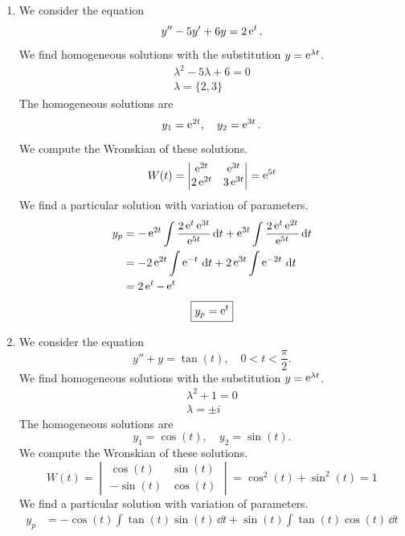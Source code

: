 {%
\begin{Solution}
  \label{solution y5y6y2et}
  \begin{enumerate}
  \item 
    We consider the equation
    \[
    y'' - 5 y' + 6 y = 2 \mathop{\mathrm{e}}\nolimits^t.
    \]
    We find homogeneous solutions with the substitution $y = \mathop{\mathrm{e}}\nolimits^{\lambda t}$.
    \begin{gather*}
      \lambda^2 - 5 \lambda + 6 = 0 \\
      \lambda = \{ 2, 3 \} 
    \end{gather*}
    The homogeneous solutions are
    \[
    y_1 = \mathop{\mathrm{e}}\nolimits^{2t}, \quad y_2 = \mathop{\mathrm{e}}\nolimits^{3t}.
    \]
    We compute the Wronskian of these solutions.
    \[
    W(t) = \begin{vmatrix}
      \mathop{\mathrm{e}}\nolimits^{2t} & \mathop{\mathrm{e}}\nolimits^{3t} \\
      2 \mathop{\mathrm{e}}\nolimits^{2t} & 3 \mathop{\mathrm{e}}\nolimits^{3t}
    \end{vmatrix}
    = \mathop{\mathrm{e}}\nolimits^{5 t}
    \]
    We find a particular solution with variation of parameters.
    \begin{align*}
      y_p &= - \mathop{\mathrm{e}}\nolimits^{2t} \int \frac{ 2 \mathop{\mathrm{e}}\nolimits^t \mathop{\mathrm{e}}\nolimits^{3t} }{ \mathop{\mathrm{e}}\nolimits^{5t} } \,\mathrm{d} t
      + \mathop{\mathrm{e}}\nolimits^{3t} \int \frac{ 2 \mathop{\mathrm{e}}\nolimits^t \mathop{\mathrm{e}}\nolimits^{2t} }{ \mathop{\mathrm{e}}\nolimits^{5t} } \,\mathrm{d} t \\
      &= - 2 \mathop{\mathrm{e}}\nolimits^{2t} \int \mathop{\mathrm{e}}\nolimits^{-t} \,\mathrm{d} t + 2 \mathop{\mathrm{e}}\nolimits^{3t} \int \mathop{\mathrm{e}}\nolimits^{-2 t} \,\mathrm{d} t \\
      &= 2 \mathop{\mathrm{e}}\nolimits^t - \mathop{\mathrm{e}}\nolimits^t 
    \end{align*}
    \[
    \boxed{
      y_p = \mathop{\mathrm{e}}\nolimits^t
      }
    \]
  \item 
    We consider the equation
    \[
    y'' + y = \tan(t), \quad 0 < t < \frac{\pi}{2}.
    \]
    We find homogeneous solutions with the substitution $y = \mathop{\mathrm{e}}\nolimits^{\lambda t}$.
    \begin{gather*}
      \lambda^2 + 1 = 0 \\
      \lambda = \pm i
    \end{gather*}
    The homogeneous solutions are
    \[
    y_1 = \cos(t), \quad y_2 = \sin(t).
    \]
    We compute the Wronskian of these solutions.
    \[
    W(t) = \begin{vmatrix}
      \cos(t) & \sin(t) \\
      - \sin(t) & \cos(t)
    \end{vmatrix}
    = \cos^2(t) + \sin^2(t)
    = 1
    \]
    We find a particular solution with variation of parameters.
    \begin{align*}
      y_p &= - \cos(t) \int \tan(t) \sin(t) \,\dd t
      + \sin(t) \int \tan(t) \cos(t) \,\dd t \\

\end{align*}
\end{enumerate}
\end{Solution}}
